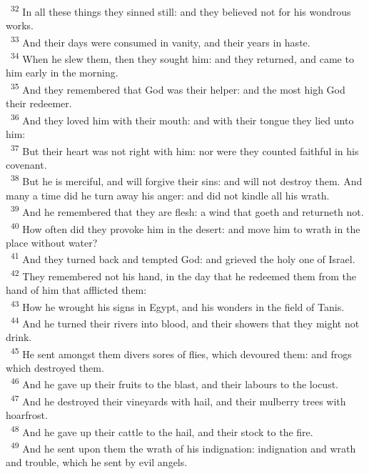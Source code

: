 \documentclass[a5paper,12pt]{article}
\begin{document}
\begin{multicols*}{2}
~\textsuperscript{32} In all these things they sinned still: and they believed not for his wondrous works.\\
~\textsuperscript{33} And their days were consumed in vanity, and their years in haste.\\
~\textsuperscript{34} When he slew them, then they sought him: and they returned, and came to him early in the morning.\\
~\textsuperscript{35} And they remembered that God was their helper: and the most high God their redeemer.\\
~\textsuperscript{36} And they loved him with their mouth: and with their tongue they lied unto him:\\
~\textsuperscript{37} But their heart was not right with him: nor were they counted faithful in his covenant.\\
~\textsuperscript{38} But he is merciful, and will forgive their sins: and will not destroy them. And many a time did he turn away his anger: and did not kindle all his wrath.\\
~\textsuperscript{39} And he remembered that they are flesh: a wind that goeth and returneth not.\\
~\textsuperscript{40} How often did they provoke him in the desert: and move him to wrath in the place without water?\\
~\textsuperscript{41} And they turned back and tempted God: and grieved the holy one of Israel.\\
~\textsuperscript{42} They remembered not his hand, in the day that he redeemed them from the hand of him that afflicted them:\\
~\textsuperscript{43} How he wrought his signs in Egypt, and his wonders in the field of Tanis.\\
~\textsuperscript{44} And he turned their rivers into blood, and their showers that they might not drink.\\
~\textsuperscript{45} He sent amongst them divers sores of flies, which devoured them: and frogs which destroyed them.\\
~\textsuperscript{46} And he gave up their fruits to the blast, and their labours to the locust.\\
~\textsuperscript{47} And he destroyed their vineyards with hail, and their mulberry trees with hoarfrost.\\
~\textsuperscript{48} And he gave up their cattle to the hail, and their stock to the fire.\\
~\textsuperscript{49} And he sent upon them the wrath of his indignation: indignation and wrath and trouble, which he sent by evil angels.\\

\end{multicols*}
\end{document}
